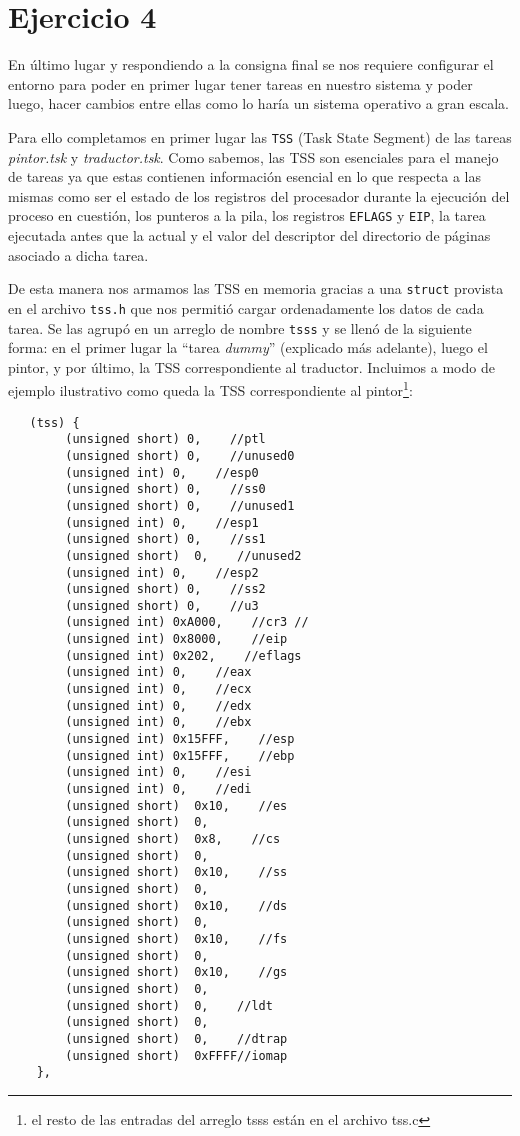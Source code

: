 \section{Ejercicio 4}

En último lugar y respondiendo a la consigna final se nos requiere configurar el entorno para poder en primer lugar tener tareas en nuestro sistema y poder luego, hacer cambios entre ellas como lo haría un sistema operativo a gran escala. %

Para ello completamos en primer lugar las \texttt{TSS} (Task State Segment) de las tareas \emph{pintor.tsk} y \emph{traductor.tsk}. Como sabemos, las TSS son esenciales para el manejo de tareas ya que estas contienen información esencial en lo que respecta a las mismas como ser el estado de los registros del procesador durante la ejecución del proceso en cuestión, los punteros a la pila, los registros \texttt{EFLAGS} y \texttt{EIP}, la tarea ejecutada antes que la actual y el valor del descriptor del directorio de páginas asociado a dicha tarea. 

De esta manera nos armamos las TSS en memoria gracias a una \texttt{struct} provista en el archivo \texttt{tss.h} que nos permitió cargar ordenadamente los datos de cada tarea. Se las agrupó en un arreglo de nombre \texttt{tsss} y se llenó de la siguiente forma: en el primer lugar la ``tarea \emph{dummy}'' (explicado más adelante), luego el pintor, y por último, la TSS correspondiente al traductor. Incluimos a modo de ejemplo ilustrativo como queda la TSS correspondiente al pintor\footnote{el resto de las entradas del arreglo tsss están en el archivo tss.c}:

\begin{verbatim}
   (tss) {
        (unsigned short) 0,    //ptl
        (unsigned short) 0,    //unused0
        (unsigned int) 0,    //esp0
        (unsigned short) 0,    //ss0
        (unsigned short) 0,    //unused1
        (unsigned int) 0,    //esp1
        (unsigned short) 0,    //ss1
        (unsigned short)  0,    //unused2
        (unsigned int) 0,    //esp2
        (unsigned short) 0,    //ss2
        (unsigned short) 0,    //u3
        (unsigned int) 0xA000,    //cr3 //
        (unsigned int) 0x8000,    //eip
        (unsigned int) 0x202,    //eflags
        (unsigned int) 0,    //eax
        (unsigned int) 0,    //ecx
        (unsigned int) 0,    //edx
        (unsigned int) 0,    //ebx
        (unsigned int) 0x15FFF,    //esp
        (unsigned int) 0x15FFF,    //ebp
        (unsigned int) 0,    //esi
        (unsigned int) 0,    //edi
        (unsigned short)  0x10,    //es
        (unsigned short)  0,
        (unsigned short)  0x8,    //cs
        (unsigned short)  0,
        (unsigned short)  0x10,    //ss
        (unsigned short)  0,
        (unsigned short)  0x10,    //ds
        (unsigned short)  0,
        (unsigned short)  0x10,    //fs
        (unsigned short)  0,
        (unsigned short)  0x10,    //gs
        (unsigned short)  0,
        (unsigned short)  0,    //ldt
        (unsigned short)  0,
        (unsigned short)  0,    //dtrap
        (unsigned short)  0xFFFF//iomap
    },
\end{verbatim}

